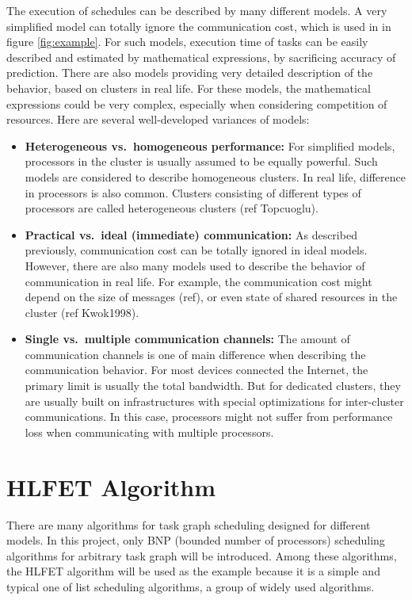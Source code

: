 \documentclass[msc,deptreport, cs]{infthesis}
\begin{document}
The execution of schedules can be described by many different models. A very simplified model can totally ignore the communication cost, which is used in in figure \ref{fig:example}. For such models, execution time of tasks can be easily described and estimated by mathematical expressions, by sacrificing accuracy of prediction. There are also models providing very detailed description of the behavior, based on clusters in real life. For these models, the mathematical expressions could be very complex, especially when considering competition of resources. Here are several well-developed variances of models:
\begin{itemize}
    \item \textbf{Heterogeneous vs.\ homogeneous performance:} For simplified models, processors in the cluster is usually assumed to be equally powerful. Such models are considered to describe homogeneous clusters. In real life, difference in processors is also common. Clusters consisting of different types of processors are called heterogeneous clusters (ref Topcuoglu). 
    \item \textbf{Practical vs.\ ideal (immediate) communication:} As described previously, communication cost can be totally ignored in ideal models. However, there are also many models used to describe the behavior of communication in real life. For example, the communication cost might depend on the size of messages (ref), or even state of shared resources in the cluster (ref Kwok1998).
    \item \textbf{Single vs.\ multiple communication channels:} The amount of communication channels is one of main difference when describing the communication behavior. For most devices connected the Internet, the primary limit is usually the total bandwidth. But for dedicated clusters, they are usually built on infrastructures with special optimizations for inter-cluster communications. In this case, processors might not suffer from performance loss when communicating with multiple processors.
\end{itemize}

\section{HLFET Algorithm}

There are many algorithms for task graph scheduling designed for different models. In this project, only BNP (bounded number of processors) scheduling algorithms for arbitrary task graph will be introduced. Among these algorithms, the HLFET algorithm will be used as the example because it is a simple and typical one of list scheduling algorithms, a group of widely used algorithms.
\end{document}
